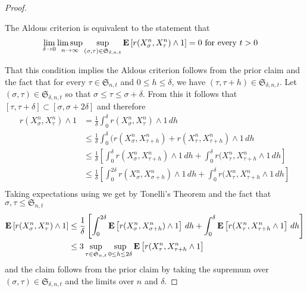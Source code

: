 \begin{proof}
\begin{clm}The Aldous criterion is equivalent to the statement that
\begin{align*}
\lim_{\delta \to 0} \limsup_{n \to \infty} \sup_{(\sigma, \tau) \in
  \mathfrak{S}_{\delta,n,t}} \textbf{E}\left[r(X^n_\sigma, X^n_\tau) \wedge
  1\right] &= 0 \text{ for every $t > 0$}
\end{align*}
\end{clm}
That this condition implies the Aldous criterion follows from the prior claim and the fact that for every $\tau \in \mathfrak{S}_{n,t}$ and $0 \leq h \leq \delta$, we have $(\tau, \tau+h) \in \mathfrak{S}_{\delta, n,t}$.
Let $(\sigma, \tau) \in \mathfrak{S}_{\delta,n,t}$ so that $\sigma \leq \tau \leq \sigma +\delta$.  From this it follows that $[\tau, \tau+ \delta] \subset [\sigma, \sigma + 2\delta]$ and therefore
\begin{align*}
r(X^n_\sigma, X^n_\tau) \wedge 1 &= \frac{1}{\delta} \int_0^\delta r(X^n_\sigma, X^n_\tau) \wedge 1 \, dh \\
&\leq \frac{1}{\delta} \int_0^\delta (r(X^n_\sigma, X^n_{\tau+h}) + r(X^n_\tau, X^n_{\tau+h}) \wedge 1 \, dh \\
&\leq \frac{1}{\delta} \left[ \int_0^\delta r(X^n_\sigma, X^n_{\tau+h}) \wedge 1 \, dh + \int_0^\delta r(X^n_\tau, X^n_{\tau+h} \wedge 1 \, dh \right ] \\
&\leq \frac{1}{\delta} \left[ \int_0^{2\delta} r(X^n_\sigma, X^n_{\sigma+h}) \wedge 1 \, dh + \int_0^\delta r(X^n_\tau, X^n_{\tau+h} \wedge 1 \, dh \right ] \\
\end{align*}
Taking expectations using we get by Tonelli's Theorem and the fact that $\sigma, \tau \leq \mathfrak{S}_{n,t}$
\begin{align*}
\textbf{E}\left[r(X^n_\sigma, X^n_\tau) \wedge 1\right] &\leq \frac{1}{\delta} \left[ \int_0^{2\delta} \textbf{E}\left[r(X^n_\sigma, X^n_{\sigma+h}) \wedge 1\right] \, dh + 
\int_0^\delta \textbf{E}\left[r(X^n_\tau, X^n_{\tau+h} \wedge 1\right] \, dh \right ] \\
&\leq 3 \sup_{\tau \in \mathfrak{S}_{n,t}} \sup_{0 \leq h \leq 2\delta} \textbf{E}\left[r(X^n_\tau, X^n_{\tau+h} \wedge 1\right]
\end{align*}
and the claim follows from the prior claim by taking the supremum over $(\sigma, \tau) \in \mathfrak{S}_{\delta,n,t}$ and the limits  over $n$ and $\delta$.


\end{proof}
